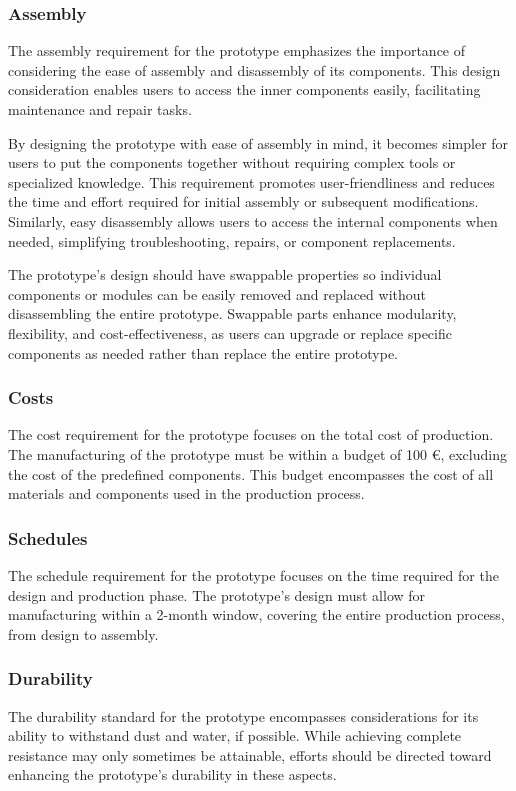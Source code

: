 \subsubsection{Assembly}
The assembly requirement for the prototype emphasizes the importance of considering the ease of assembly and disassembly of its components. This design consideration enables users to access the inner components easily, facilitating maintenance and repair tasks.

By designing the prototype with ease of assembly in mind, it becomes simpler for users to put the components together without requiring complex tools or specialized knowledge. This requirement promotes user-friendliness and reduces the time and effort required for initial assembly or subsequent modifications. Similarly, easy disassembly allows users to access the internal components when needed, simplifying troubleshooting, repairs, or component replacements.

The prototype's design should have swappable properties so individual components or modules can be easily removed and replaced without disassembling the entire prototype. Swappable parts enhance modularity, flexibility, and cost-effectiveness, as users can upgrade or replace specific components as needed rather than replace the entire prototype.

\subsubsection{Costs}
The cost requirement for the prototype focuses on the total cost of production. The manufacturing of the prototype must be within a budget of 100 €, excluding the cost of the predefined components. This budget encompasses the cost of all materials and components used in the production process.

\subsubsection{Schedules}
The schedule requirement for the prototype focuses on the time required for the design and production phase. The prototype's design must allow for manufacturing within a 2-month window, covering the entire production process, from design to assembly.

\subsubsection{Durability}
The durability standard for the prototype encompasses considerations for its ability to withstand dust and water, if possible. While achieving complete resistance may only sometimes be attainable, efforts should be directed toward enhancing the prototype's durability in these aspects.

